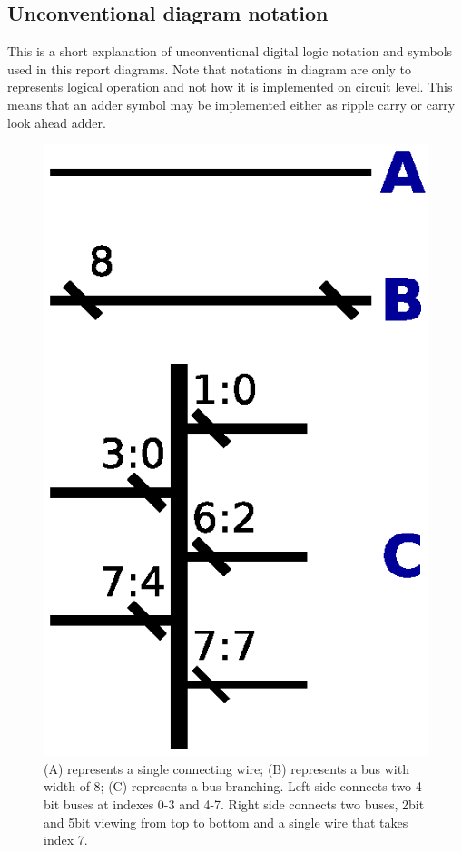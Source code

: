 \pagebreak
\subsection{Unconventional diagram notation}\label{subsec:notation}
This is a short explanation of unconventional digital logic notation and symbols used in this report diagrams. Note that notations in diagram are only to represents logical operation and not how it is implemented on circuit level. This means that an adder symbol may be implemented either as ripple carry or carry look ahead adder.

\begin{figure}[bh]
	\centering
	\includegraphics[scale=0.4]{../resources/symbols/wires.eps}
	\caption{(A) represents a single connecting wire; (B) represents a bus with width of 8; (C) represents a bus branching. Left side connects two 4 bit buses at indexes 0-3 and 4-7. Right side connects two buses, 2bit and 5bit viewing from top to bottom and a single wire that takes index 7.}

\end{figure}

